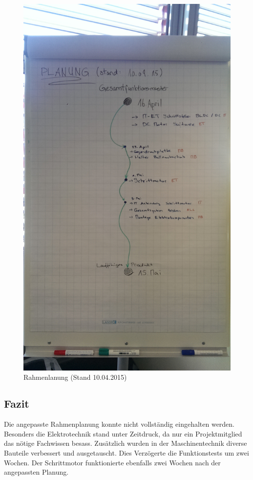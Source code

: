 \begin{figure}[h!]
	\centering
	\includegraphics[width=0.6\linewidth]{../../fig/rahmenplanung-10042015}
	\caption{Rahmenlanung (Stand 10.04.2015)}
	\label{fig:rahmenplanung-10042015}
\end{figure}

\subsection{Fazit}
Die angepasste Rahmenplanung konnte nicht vollständig eingehalten werden. Besonders die Elektrotechnik stand unter Zeitdruck, da nur ein Projektmitglied das nötige Fachwissen besass.
Zusätzlich wurden in der Maschinentechnik diverse Bauteile verbessert und ausgetauscht. Dies Verzögerte die Funktionstests um zwei Wochen.
Der Schrittmotor funktionierte ebenfalls zwei Wochen nach der angepassten Planung.
